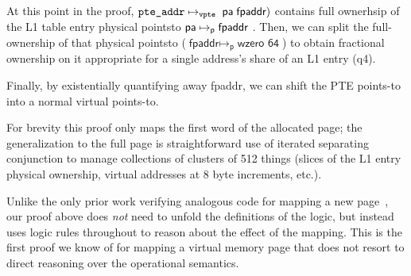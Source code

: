 At this point in the proof,  $\texttt{pte\_addr} \mapsto_{\texttt{vpte}}  \; \textsf{pa}\; \textsf{fpaddr})$ 
contains  full ownerhsip of the L1 table entry physical pointsto $\textsf{pa}
\mapsto_{\mathsf{p}} \textsf{fpaddr}$ . Then, we can split the full-ownership of that
physical pointsto
($\textsf{fpaddr}\mapsto_{\textsf{p}} \;\textsf{wzero 64}$) to obtain
fractional ownership on it appropriate for a single address's share of an L1 entry (q4).
\begin{comment}
Since we know $\texttt{addr\_L1 }(\vaddr,
\entryo) \mapsto_{\mathsf{p}} \{q4\} \;\textsf{fpaddr}$) from
$\mapsto_{\textsf{vpte}}$, after the split of the PTE points-to, and, thanks to the post-condition of the page-table walk (Specification of \textsf{pte\_walkpgdir} in Figure \ref{}), we know the existence of L4-L2 mappings reaching to the L1 exist, so that we can add the last mapping $\texttt{fpaddr} \mapsto_{p} (\texttt{wzero 64})$ to obtain the complete table-walk.
\todo{with the virtual-pte-pointsto assertions (L4\_L1\_PointsTo($\vaddr$ l4e l3e l2e
fpaddr)) in Line 25}

Finally, we can insert $\vaddr$ into the ghost page-table-walk summarization
map ($\theta$) to change its state from unmapped ($\ulcorner \theta
\;!!\;\vaddr = \texttt{None}\urcorner$ (Line 28) and the
precondition) to mapped (Line 29) using Iris' ghost-map update
($\sqsubseteq$), and construct a PTE -points-to $\vaddr
\mapsto_{\textsf{vpte}}\; \qfrac \;\fpaddr\;(\textsf{wzero 64})$ (Line 31) using $\sumwalkabs\vaddr\qfrac\fpaddr$ obtained from ghost
page-table-walk insertions, $\ghostmaptoken{\delta{}s}{\rtv}{\delta}$ from unfolding the
definition of $\mapsto_{\textsf{vpte}}$, and $\fpaddr
\mapsto_{\textsf{p}} \textsf{wzero 64}$.
\end{comment}
Finally, by existentially quantifying away \textsf{fpaddr},
we can shift the PTE points-to into a normal virtual points-to.

For brevity this proof only maps the first word of the allocated page; the generalization to the full page
is straightforward use of iterated separating conjunction to manage collections of clusters of 512 things
(slices of the L1 entry physical ownership, virtual addresses at 8 byte increments, etc.).

Unlike the only prior work verifying analogous code for mapping a new page~\cite{kolanski08vstte,kolanski09tphols}, our proof above
does \emph{not} need to unfold the definitions of the logic,
but instead uses logic rules throughout to reason about the effect of the mapping. 
This is the first proof we know of for mapping a virtual memory page that does not resort to direct reasoning over the operational semantics.
